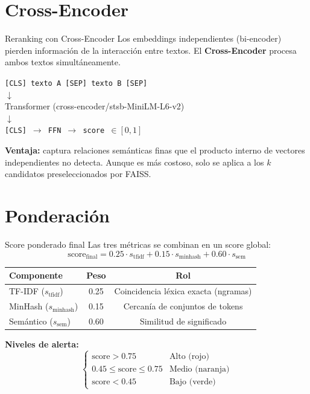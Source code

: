 \documentclass[aspectratio=169]{beamer}
\begin{document}
\section{Cross-Encoder}

\begin{frame}{Reranking con Cross-Encoder}
  Los embeddings independientes (bi-encoder) pierden información de la interacción entre textos. El \textbf{Cross-Encoder} procesa ambos textos simultáneamente.
  \vspace{0.5em}
  \begin{center}
    \texttt{[CLS] texto A [SEP] texto B [SEP]} \\
    $\downarrow$ \\
    Transformer (cross-encoder/stsb-MiniLM-L6-v2) \\
    $\downarrow$ \\
    \texttt{[CLS] $\rightarrow$ FFN $\rightarrow$ score $\in [0, 1]$}
  \end{center}
  \vspace{0.5em}
  \textbf{Ventaja:} captura relaciones semánticas finas que el producto interno de vectores independientes no detecta. Aunque es más costoso, solo se aplica a los $k$ candidatos preseleccionados por FAISS.
\end{frame}

\section{Ponderación}

\begin{frame}{Score ponderado final}
  Las tres métricas se combinan en un score global:
  \[
  \boxed{\text{score}_{\text{final}} = 0.25 \cdot s_{\text{tfidf}} + 0.15 \cdot s_{\text{minhash}} + 0.60 \cdot s_{\text{sem}}}
  \]
  \vspace{0.5em}
  \begin{center}
    \begin{tabular}{lcc}
      \textbf{Componente} & \textbf{Peso} & \textbf{Rol} \\
      \hline
      TF-IDF ($s_{\text{tfidf}}$)    & 0.25 & Coincidencia léxica exacta (ngramas) \\
      MinHash ($s_{\text{minhash}}$) & 0.15 & Cercanía de conjuntos de tokens \\
      Semántico ($s_{\text{sem}}$)   & 0.60 & Similitud de significado \\
      \hline
    \end{tabular}
  \end{center}
  \vspace{0.5em}
  \textbf{Niveles de alerta:}
  \[
  \begin{cases}
    \text{score} > 0.75 & \text{Alto (rojo)} \\
    0.45 \leq \text{score} \leq 0.75 & \text{Medio (naranja)} \\
    \text{score} < 0.45 & \text{Bajo (verde)}
  \end{cases}
  \]
\end{frame}
\end{document}
